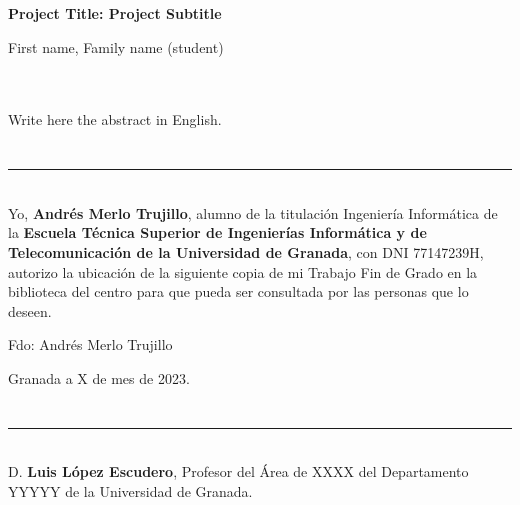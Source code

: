 \cleardoublepage


\thispagestyle{empty}


\begin{center}
{\large\bfseries Project Title: Project Subtitle}\\
\end{center}
\begin{center}
First name, Family name (student)\\
\end{center}

\\

\vspace{0.7cm}
\\

Write here the abstract in English.

\chapter*{}
\thispagestyle{empty}

\noindent\rule[-1ex]{\textwidth}{2pt}\\[4.5ex]

Yo, \textbf{Andrés Merlo Trujillo}, alumno de la titulación Ingeniería Informática de la \textbf{Escuela Técnica Superior
de Ingenierías Informática y de Telecomunicación de la Universidad de Granada}, con DNI 77147239H, autorizo la
ubicación de la siguiente copia de mi Trabajo Fin de Grado en la biblioteca del centro para que pueda ser
consultada por las personas que lo deseen.

\vspace{6cm}

\noindent Fdo: Andrés Merlo Trujillo

\vspace{2cm}

\begin{flushright}
Granada a X de mes de 2023.
\end{flushright}


\chapter*{}
\thispagestyle{empty}

\noindent\rule[-1ex]{\textwidth}{2pt}\\[4.5ex]

D. \textbf{Luis López Escudero}, Profesor del Área de XXXX del Departamento YYYYY de la Universidad de Granada.

